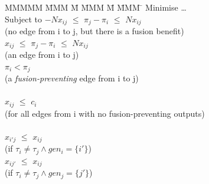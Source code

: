 \begin{tabbing}
MMMMM   \= MMM \= M \= MMM \= M \= MMM \= \kill
Minimise   \> \ldots \\
Subject to \> $-N x_{ij}$ \> $\le$ \> $\pi_j - \pi_i$ \> $\le$ \> $N x_{ij}$ \\
           \>             (no edge from i to j, but there is a fusion benefit)            \\
           \>    $x_{ij}$ \> $\le$ \> $\pi_j - \pi_i$ \> $\le$ \> $N x_{ij}$ \\
           \>             (an edge from i to j)            \\
           \>             \>       \> $\pi_i < \pi_j$ \>       \>            \\
           \>             (a \emph{fusion-preventing} edge from i to j)            \\
\\
           \> $x_{ij}$    \> $\le$ \> $c_i$           \>       \>            \\
           \> (for all edges from i with no fusion-preventing outputs)      \\
\\
           \> $x_{i'j}$   \> $\le$ \> $x_{ij}$        \>       \>            \\
           \> (if $\tau_i \not= \tau_j \wedge gen_i=\{i'\}$) \\
           \> $x_{ij'}$   \> $\le$ \> $x_{ij}$        \>       \>            \\
           \> (if $\tau_i \not= \tau_j \wedge gen_j=\{j'\}$) \\
\end{tabbing}

% 
